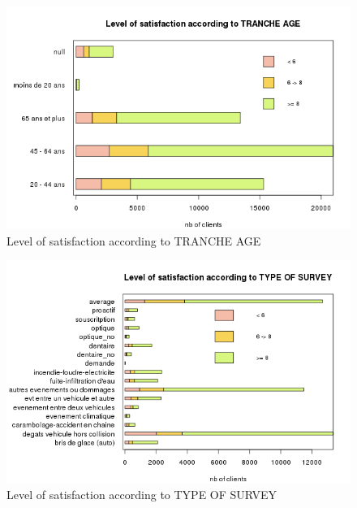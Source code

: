 \documentclass[a4paper, 11pt]{article}
\begin{document}
    \begin{figure}[!ht]
    	\centering
            \includegraphics[height = 10 cm]{Remi/Level_of_satisfaction_according_to_TRANCHE_AGE.png}
            \caption{Level of satisfaction according to TRANCHE AGE}
            \label{fig:TRANCHE_AGE}
    \end{figure}
    
    \begin{figure}[!ht]
    	\centering
            \includegraphics[height = 10 cm]{Remi/Level_of_satisfaction_according_to_TYPE_OF_SURVEY.png}
            \caption{Level of satisfaction according to TYPE OF SURVEY}
            \label{fig:TYPE_OF_SURVEY}
    \end{figure}
    
\end{document}
